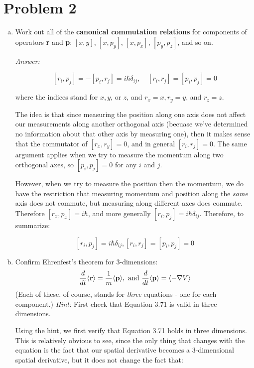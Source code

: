 \documentclass[10pt]{article}
\begin{document}
    \section*{Problem 2}

    \begin{enumerate}[(a)]
        \item Work out all of the \textbf{canonical commutation relations} for components of operators \textbf{r} and \textbf{p}: $[x, y]$, $[x, p_y]$, $[x, p_x]$, $[p_y, p_z]$, and so on. 
        
        \textit{Answer:}
        
        \[ [r_i, p_j] = -[p_i, r_j] = i\hbar \delta_{ij}, \phantom{aa} [r_i, r_j] = [p_i, p_j] = 0\]

        where the indices stand for $x, y$, or $z$, and $r_x = x, r_y = y$, and $r_z = z$.

        \begin{solution}
            The idea is that since measuring the position along one axis does not affect our measurements along another orthogonal axis (becuase we've determined no information about that other axis by measuring one), then it makes sense that the commutator of $[r_x, r_y] = 0$, and in general $[r_i, r_j] = 0$. The same argument applies when we try to measure the momentum along two orthogonal axes, so $[p_i, p_j] = 0$ for any $i$ and $j$. 
            
            However, when we try to measure the position then the momentum, we do have the restriction that measuring momentum and position along the \textit{same} axis does not commute, but measuring along different axes does commute. Therefore $[r_x, p_x] = i\hbar$, and more generally $[r_i, p_j] = i\hbar \delta_{ij}$. Therefore, to summarize:

            \[ [r_i, p_j] = i\hbar \delta_{ij},  [r_i, r_j] = [p_i, p_j] = 0\]
        \end{solution}
        \item Confirm Ehrenfest's theorem for 3-dimensions: 
        \[ \frac{d}{dt} \langle \mathbf{r} \rangle = \frac{1}{m}\langle \mathbf{p} \rangle, \text{ and } \frac{d}{dt}\langle \mathbf{p} \rangle = \langle -\nabla V \rangle\]
        (Each of these, of course, stands for \textit{three} equations - one for each component.) \textit{Hint:} First check that Equation 3.71 is valid in three dimensions.

        \begin{solution}
            Using the hint, we first verify that Equation 3.71 holds in three dimensions. This is relatively obvious to see, since the only thing that changes with the \schrodinger equation is the fact that our spatial derivative becomes a 3-dimensional spatial derivative, but it does not change the fact that:


\end{solution}
\end{enumerate}
\end{document}

